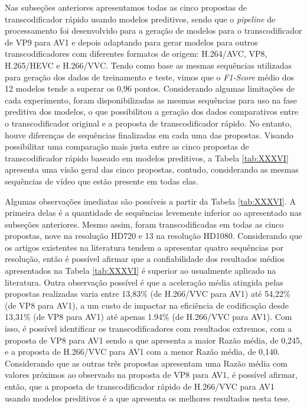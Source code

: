Nas subseções anteriores apresentamos todas as cinco propostas de transcodificador rápido usando modelos preditivos, sendo que o \textit{pipeline} de processamento foi desenvolvido para a geração de modelos para o transcodificador de VP9 para AV1 e depois adaptando para gerar modelos para outros transcodificadores com diferentes formatos de origem: H.264/AVC, VP8, H.265/HEVC e H.266/VVC. Tendo como base as mesmas sequências utilizadas para geração dos dados de treinamento e teste, vimos que o \textit{F1-Score} médio dos 12 modelos tende a superar os 0,96 pontos. Considerando algumas limitações de cada experimento, foram disponibilizadas as mesmas sequências para uso na fase preditiva dos modelos, o que possibilitou a geração dos dados comparativos entre o transcodificador original e a proposta de transcodificador rápido. No entanto, houve diferenças de sequências finalizadas em cada uma das propostas. Visando possibilitar uma comparação mais justa entre as cinco propostas de transcodificador rápido baseado em modelos preditivos, a Tabela \ref{tab:XXXVI} apresenta uma visão geral das cinco propostas, contudo, considerando as mesmas sequências de vídeo que estão presente em todas elas.



Algumas observações imediatas são possíveis a partir da Tabela \ref{tab:XXXVI}. A primeira delas é a quantidade de sequências levemente inferior ao apresentado nas subseções anteriores. Mesmo assim, foram transcodificadas em todas as cinco propostas, nove na resolução HD720 e 13 na resolução HD1080. Considerando que os artigos existentes na literatura tendem a apresentar quatro sequências por resolução, então é possível afirmar que a confiabilidade dos resultados médios apresentados na Tabela \ref{tab:XXXVI} é superior ao usualmente aplicado na literatura. Outra observação possível é que a aceleração média atingida pelas propostas realizadas varia entre 13,83\% (de H.266/VVC para AV1) até 54,22\% (de VP8 para AV1), a um custo de impactar na eficiência de codificação desde 13,31\% (de VP8 para AV1) até apenas 1.94\% (de H.266/VVC para AV1). Com isso, é possível identificar os transcodificadores com resultados extremos, com a proposta de VP8 para AV1 sendo a que apresenta a maior Razão média, de 0,245, e a proposta de H.266/VVC para AV1 com a menor Razão média, de 0,140. Considerando que as outras três propostas apresentam uma Razão média com valores próximos ao observado na proposta de VP8 para AV1, é possível afirmar, então, que a proposta de transcodificador rápido de H.266/VVC para AV1 usando modelos preditivos é a que apresenta os melhores resultados nesta tese.

